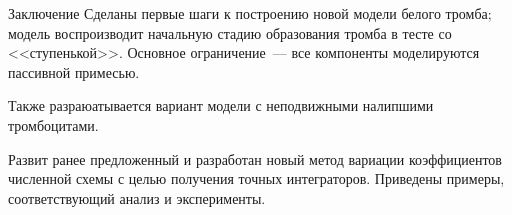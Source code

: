 \documentclass[
    14pt,
    xcolor=dvipsnames,
    aspectratio=169
]{beamer}
\begin{document}
% 
% 
% 

\begin{frame}{Заключение}
    Сделаны первые шаги к построению новой модели белого тромба;
    модель воспроизводит начальную стадию образования тромба в тесте со <<ступенькой>>.
    Основное ограничение~--- все компоненты моделируются пассивной примесью.

    Также разраюатывается вариант модели с неподвижными налипшими тромбоцитами.

    Развит ранее предложенный и разработан новый метод вариации коэффициентов численной схемы
    с целью получения точных интеграторов.
    Приведены примеры, соответствующий анализ и эксперименты.
\end{frame}

\begin{frame}[allowframebreaks]
    \printbibliography
\end{frame}
\end{document}
